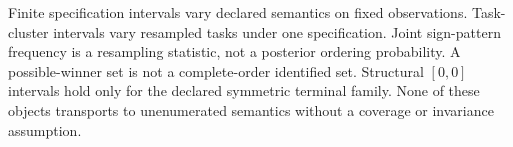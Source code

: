 Finite specification intervals vary declared semantics on fixed observations.  Task-cluster intervals vary resampled tasks under one specification.  Joint sign-pattern frequency is a resampling statistic, not a posterior ordering probability.  A possible-winner set is not a complete-order identified set.  Structural \([0,0]\) intervals hold only for the declared symmetric terminal family.  None of these objects transports to unenumerated semantics without a coverage or invariance assumption.
